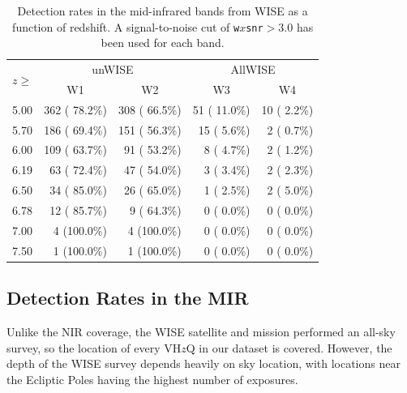 \documentclass[usenatbib]{mnras}
\begin{document}
\begin{table}
  \centering
  \begin{tabular}{l r r r r}
    \hline \hline
    \multirow{ 2}{*}{$z \geq$} & \multicolumn{2}{c}{unWISE} &  \multicolumn{2}{c}{AllWISE}   \\ 
                                             & \multicolumn{1}{c}{W1} & \multicolumn{1}{c}{W2} & \multicolumn{1}{c}{W3} & \multicolumn{1}{c}{W4}  \\ 
    \hline
    5.00   &   362 ( 78.2\%)   &   308 ( 66.5\%)  &    51 ( 11.0\%)  &    10 (  2.2\%) \\ 
    5.70   &   186 ( 69.4\%)   &   151 ( 56.3\%)  &    15 (  5.6\%)  &     2 (  0.7\%) \\ 
    6.00   &   109 ( 63.7\%)   &    91 ( 53.2\%)  &     8 (  4.7\%)  &     2 (  1.2\%) \\ 
    6.19   &    63 ( 72.4\%)   &    47 ( 54.0\%)  &     3 (  3.4\%)  &     2 (  2.3\%) \\ 
    6.50   &    34 ( 85.0\%)   &    26 ( 65.0\%)  &     1 (  2.5\%)  &     2 (  5.0\%) \\ 
    6.78   &    12 ( 85.7\%)   &     9 ( 64.3\%)  &     0 (  0.0\%)  &     0 (  0.0\%) \\ 
    7.00   &     4 (100.0\%)   &     4 (100.0\%)  &     0 (  0.0\%)  &     0 (  0.0\%) \\ 
    7.50   &     1 (100.0\%)   &     1 (100.0\%)  &     0 (  0.0\%)  &     0 (  0.0\%) \\ 
    \hline \hline
  \end{tabular}
  \caption{Detection rates in the mid-infrared bands from WISE as a function of 
    redshift. A signal-to-noise cut of {\tt w$x$snr}$>3.0$ has been used for each band.}
  \label{tab:mir_detection}
\end{table}

\subsection{Detection Rates in the MIR}
Unlike the NIR coverage, the WISE satellite and mission performed an all-sky survey, so the location of every VH$z$Q in our dataset is covered. However, the depth of the WISE survey depends heavily on sky location, with locations near the Ecliptic Poles having the highest number of exposures.
\end{document}
